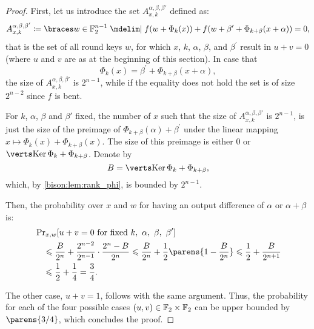 \begin{proof}
First, let us introduce the set $A_{x,k}^{\alpha, \beta, \beta'}$ defined as:
\begin{equation*}
    A_{x,k}^{\alpha, \beta, \beta'} \coloneqq \set{w \in \F_2^{n-1} \given f(w + \Phi_{k}(x)) + f(w + \beta^\prime + \Phi_{k + \beta}(x + \alpha)) = 0},
\end{equation*}
that is the set of all round keys $w$, for which $x$, $k$, $\alpha$, $\beta$, and $\beta^\prime$ result in $u+v = 0$ (where $u$ and $v$ are as at the beginning of this section).
In case that
\begin{equation*}
    \Phi_{k}(x) = \beta^\prime + \Phi_{k + \beta}(x + \alpha),
\end{equation*}
the size of $A_{x,k}^{\alpha, \beta, \beta'}$ is $2^{n-1}$, while if the equality does not hold the set is of size $2^{n-2}$ since $f$ is bent.

For $k$, $\alpha$, $\beta$ and $\beta'$ fixed, the number of $x$ such that the size of $A_{x,k}^{\alpha, \beta, \beta'}$ is $2^{n-1}$, is just the size of the preimage of $\Phi_{k+\beta}(\alpha) + \beta^\prime$ under the linear mapping $x \mapsto \Phi_k(x) + \Phi_{k+\beta}(x)$.
The size of this preimage is either $0$ or $\abs{\Ker {\Phi_k + \Phi_{k+\beta}}}$.
Denote by
\begin{equation*}
    B = \abs{\Ker {\Phi_k + \Phi_{k+\beta}}},
\end{equation*}
which, by \cref{bison:lem:rank_phi}, is bounded by $2^{n-1}$.

Then, the probability over $x$ and $w$ for having an output difference of $\alpha$ or $\alpha + \beta$ is:
\begin{align*}
    &\Prob_{x, w}[u + v = 0 \ \text{for fixed}\ k,\ \alpha,\ \beta,\ \beta^\prime] \\
    &\quad \leqslant \frac{{B}}{2^n} + \frac{2^{n-2}}{2^{n-1}} \cdot \frac{2^{n} - {B}}{2^{n}}
           \leqslant \frac{{B}}{2^n} + \frac{1}{2} \parens{1-\frac{{B}}{2^n}}
           \leqslant \frac{1}{2} + \frac{{B}}{2^{n+1}} \\
    &\quad \leqslant \frac{1}{2} + \frac{1}{4} = \frac{3}{4}.
\end{align*}

The other case, $u+v=1$, follows with the same argument.
Thus, the probability for each of the four possible cases $(u, v) \in \mathbb{F}_2 \times \mathbb{F}_2$ can be upper bounded by $\parens{3/4}$, which concludes the proof.
\end{proof}

